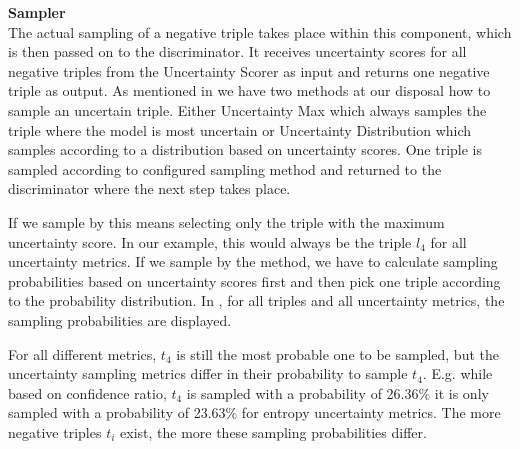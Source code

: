 \textbf{Sampler} \\
The actual sampling of a negative triple takes place within this component, which is then passed on to the discriminator.
It receives uncertainty scores for all negative triples from the Uncertainty Scorer as input and returns one negative triple as output.
As mentioned in  we have two methods at our disposal how to sample an uncertain triple.
Either Uncertainty Max which always samples the triple where the model is most uncertain or Uncertainty Distribution which samples according to a distribution based on uncertainty scores.
One triple is sampled according to configured sampling method and returned to the discriminator where the next step takes place.

If we sample by \usmax this means selecting only the triple with the maximum uncertainty score.
In our example, this would always be the triple $l_4$ for all uncertainty metrics.
If we sample by the \ussoftmax method, we have to calculate sampling probabilities based on uncertainty scores first and then pick one triple according to the probability distribution.
In , for all triples and all uncertainty metrics, the sampling probabilities are displayed.

For all different metrics, $t_4$ is still the most probable one to be sampled, but the uncertainty sampling metrics differ in their probability to sample $t_4$.
E.g. while based on confidence ratio, $t_4$ is sampled with a probability of 26.36\% it is only sampled with a probability of 23.63\% for entropy uncertainty metrics.
The more negative triples $t_i$ exist, the more these sampling probabilities differ.




